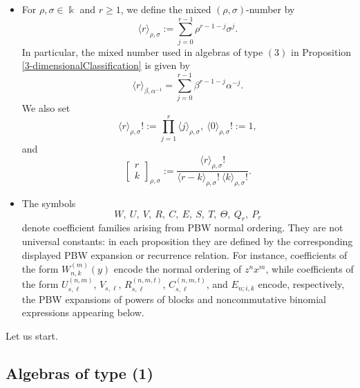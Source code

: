 \documentclass{amsart}
\theoremstyle{definition}
\theoremstyle{remark}
\numberwithin{equation}{section}
\begin{document}
\begin{itemize}
    \item For $\rho,\sigma\in\Bbbk$ and $r\geq 1$, we define the mixed
    $(\rho,\sigma)$-number by
    \[
        \langle r\rangle_{\rho,\sigma} := \sum_{j=0}^{r-1}\rho^{r-1-j}\sigma^j.
    \]
    In particular, the mixed number used in algebras of type $(3)$ in Proposition \ref{3-dimensionalClassification} is given by 
    \[
    \langle r\rangle_{\beta,\alpha^{-1}} = \sum_{j=0}^{r-1}\beta^{r-1-j}\alpha^{-j}.
    \]
    We also set
    \[
        \langle r\rangle_{\rho,\sigma}! := \prod_{j=1}^{r}\langle j\rangle_{\rho,\sigma}, \ \langle 0\rangle_{\rho,\sigma}!:=1,
    \]
    and
    \[
        \begin{bmatrix}
            r\\ k
        \end{bmatrix}_{\rho,\sigma} := \frac{\langle r\rangle_{\rho,\sigma}!}{\langle r-k\rangle_{\rho,\sigma}!\ \langle k\rangle_{\rho,\sigma}!}.
    \]

    \item The symbols
    \[
        W,\ U,\ V,\ R,\ C,\ E,\ S,\ T,\ \Theta,\ Q_r,\ P_r
    \]
    denote coefficient families arising from PBW normal ordering. They are not universal constants: in each proposition they are defined by the corresponding displayed PBW expansion or recurrence relation. For instance, coefficients of the form $W^{(m)}_{n,k}(y)$ encode the normal ordering of $z^n x^m$, while coefficients of the form $U^{(n,m)}_{s,\ell}$, $V_{s,\ell}$, $R^{(n,m,t)}_{s,\ell}$, $C^{(n,m,t)}_{s,\ell}$, and $E_{n;i,k}$ encode, respectively, the PBW expansions of powers of blocks and noncommutative binomial expressions appearing below.
\end{itemize}

Let us start.


\subsection{Algebras of type (1)}
\end{document}
